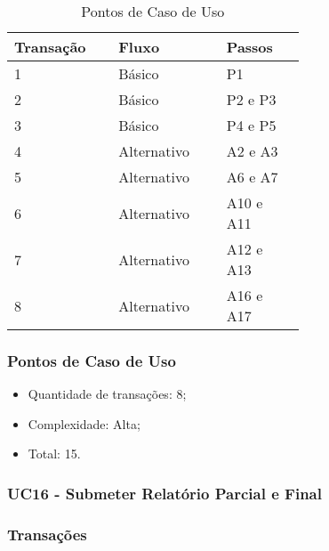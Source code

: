 \begin{table*}[!h]
\centering
\caption{Pontos de Caso de Uso}
\label{Rotulo}
  \begin{tabular}{|p{0.20\linewidth}|p{0.25\linewidth}|p{0.20\linewidth}|}
  \hline
  \textbf{Transação} & \textbf{Fluxo} & \textbf{Passos} \\ 
  \hline
  1 & Básico & P1\\
  \hline
  2 & Básico & P2 e P3\\
  \hline
  3 & Básico & P4 e P5\\
  \hline
  4 & Alternativo & A2 e A3\\
  \hline
  5 & Alternativo & A6 e A7\\
  \hline
  6 & Alternativo & A10 e A11\\
  \hline
  7 & Alternativo & A12 e A13\\
  \hline
  8 & Alternativo & A16 e A17\\
  \hline
  \end{tabular}
\end{table*}

\pagebreak
\subsubsection{Pontos de Caso de Uso}

\begin{itemize}
 \item Quantidade de transações: 8;
 \item Complexidade: Alta;
 \item Total: 15.
\end{itemize}

\subsubsection{UC16 - Submeter Relatório Parcial e Final}

\subsubsection{Transações}

